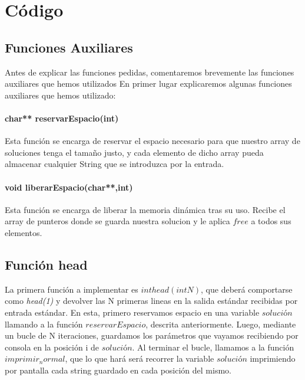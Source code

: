 \chapter{Código}
\section{Funciones Auxiliares}
Antes de explicar las funciones pedidas, comentaremos brevemente las funciones auxiliares que hemos utilizados
En primer lugar explicaremos algunas funciones auxiliares que hemos utilizado: 
\subsubsection{char** reservarEspacio(int)}
Esta función se encarga de reservar el espacio necesario para que nuestro array de soluciones tenga el tamaño justo, y cada elemento de dicho array pueda almacenar cualquier String que se introduzca por la entrada.
\subsubsection{void liberarEspacio(char**,int)}
Esta función se encarga de liberar la memoria dinámica tras su uso. Recibe el array de punteros donde se guarda nuestra solucion y le aplica $free$ a todos sus elementos.
\section{Función head}
La primera función a implementar es $int head(int N)$, que deberá comportarse como \textit{head(1)} y devolver las N primeras lineas en la salida estándar recibidas por entrada estándar.
En esta, primero reservamos espacio en una variable $solución$ llamando a la función $reservarEspacio$, descrita anteriormente. Luego, mediante un bucle de N iteraciones, guardamos los parámetros que vayamos recibiendo por consola en la posición i de $solución$.
Al terminar el bucle, llamamos a la función $imprimir_normal$, que lo que hará será recorrer la variable $solución$ imprimiendo por pantalla cada string guardado en cada posición del mismo.
